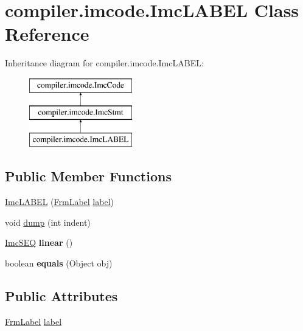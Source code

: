 \hypertarget{classcompiler_1_1imcode_1_1_imc_l_a_b_e_l}{}\section{compiler.\+imcode.\+Imc\+L\+A\+B\+EL Class Reference}
\label{classcompiler_1_1imcode_1_1_imc_l_a_b_e_l}
Inheritance diagram for compiler.\+imcode.\+Imc\+L\+A\+B\+EL\+:\begin{figure}[H]
\begin{center}
\leavevmode
\includegraphics[height=3.000000cm]{classcompiler_1_1imcode_1_1_imc_l_a_b_e_l}
\end{center}
\end{figure}
\subsection*{Public Member Functions}
\begin{DoxyCompactItemize}
\item 
\hyperlink{classcompiler_1_1imcode_1_1_imc_l_a_b_e_l_a66919e264ef6b8e398c3c59851240694}{Imc\+L\+A\+B\+EL} (\hyperlink{classcompiler_1_1frames_1_1_frm_label}{Frm\+Label} \hyperlink{classcompiler_1_1imcode_1_1_imc_l_a_b_e_l_ad06f77e89213d5abfd48ffc9b800a7b5}{label})
\item 
void \hyperlink{classcompiler_1_1imcode_1_1_imc_l_a_b_e_l_a69b88217423419c1c8ba9f2bd7bb3e8f}{dump} (int indent)
\item 
\mbox{\label{classcompiler_1_1imcode_1_1_imc_l_a_b_e_l_a411d3f59cfa2c689718d392f75254504}} 
\hyperlink{classcompiler_1_1imcode_1_1_imc_s_e_q}{Imc\+S\+EQ} {\bfseries linear} ()
\item 
\mbox{\label{classcompiler_1_1imcode_1_1_imc_l_a_b_e_l_ad53612854816ed6438f36e634fb4b9ab}} 
boolean {\bfseries equals} (Object obj)
\end{DoxyCompactItemize}
\subsection*{Public Attributes}
\begin{DoxyCompactItemize}
\item 
\hyperlink{classcompiler_1_1frames_1_1_frm_label}{Frm\+Label} \hyperlink{classcompiler_1_1imcode_1_1_imc_l_a_b_e_l_ad06f77e89213d5abfd48ffc9b800a7b5}{label}
\end{DoxyCompactItemize}


